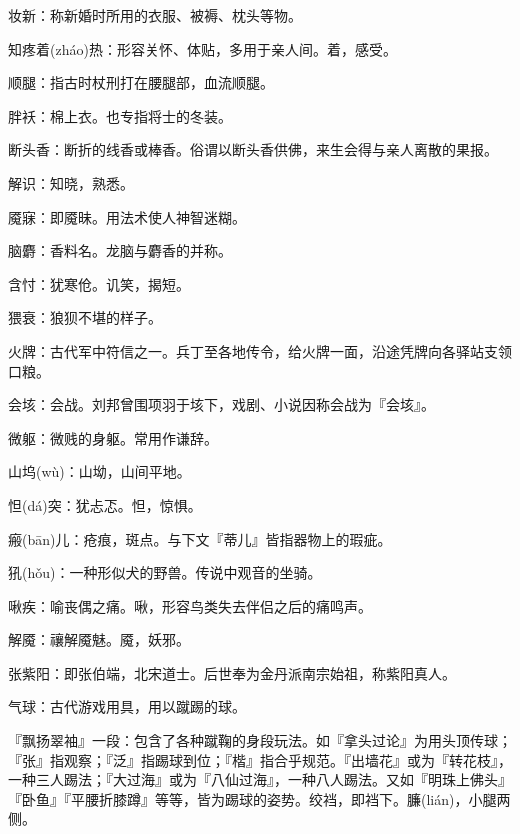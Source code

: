 \startbuffer[1977]
妆新：称新婚时所用的衣服、被褥、枕头等物。
\stopbuffer


\startbuffer[1978]
知疼着(zháo)热：形容关怀、体贴，多用于亲人间。着，感受。
\stopbuffer


\startbuffer[1979]
顺腿：指古时杖刑打在腰腿部，血流顺腿。
\stopbuffer


\startbuffer[1980]
胖袄：棉上衣。也专指将士的冬装。
\stopbuffer


\startbuffer[1981]
断头香：断折的线香或棒香。俗谓以断头香供佛，来生会得与亲人离散的果报。
\stopbuffer


\startbuffer[1982]
解识：知晓，熟悉。
\stopbuffer


\startbuffer[1983]
魇寐：即魇昧。用法术使人神智迷糊。
\stopbuffer


\startbuffer[1984]
脑麝：香料名。龙脑与麝香的并称。
\stopbuffer


\startbuffer[1985]
含忖：犹寒伧。讥笑，揭短。
\stopbuffer


\startbuffer[1986]
猥衰：狼狈不堪的样子。
\stopbuffer


\startbuffer[1987]
火牌：古代军中符信之一。兵丁至各地传令，给火牌一面，沿途凭牌向各驿站支领口粮。
\stopbuffer


\startbuffer[1988]
会垓：会战。刘邦曾围项羽于垓下，戏剧、小说因称会战为『会垓』。
\stopbuffer


\startbuffer[1989]
微躯：微贱的身躯。常用作谦辞。
\stopbuffer


\startbuffer[1990]
山坞(wù)：山坳，山间平地。
\stopbuffer


\startbuffer[1991]
怛(dá)突：犹忐忑。怛，惊惧。
\stopbuffer


\startbuffer[1992]
瘢(bān)儿：疮痕，斑点。与下文『蒂儿』皆指器物上的瑕疵。
\stopbuffer


\startbuffer[1993]
犼(hǒu)：一种形似犬的野兽。传说中观音的坐骑。
\stopbuffer


\startbuffer[1994]
啾疾：喻丧偶之痛。啾，形容鸟类失去伴侣之后的痛鸣声。
\stopbuffer


\startbuffer[1995]
解魇：禳解魇魅。魇，妖邪。
\stopbuffer


\startbuffer[1996]
张紫阳：即张伯端，北宋道士。后世奉为金丹派南宗始祖，称紫阳真人。
\stopbuffer


\startbuffer[1997]
气球：古代游戏用具，用以蹴踢的球。
\stopbuffer


\startbuffer[1998]
『飘扬翠袖』一段：包含了各种蹴鞠的身段玩法。如『拿头过论』为用头顶传球；『张』指观察；『泛』指踢球到位；『楷』指合乎规范。『出墙花』或为『转花枝』，一种三人踢法；『大过海』或为『八仙过海』，一种八人踢法。又如『明珠上佛头』『卧鱼』『平腰折膝蹲』等等，皆为踢球的姿势。绞裆，即裆下。臁(lián)，小腿两侧。
\stopbuffer


